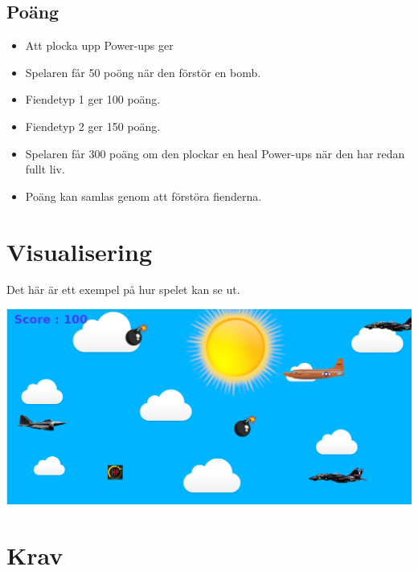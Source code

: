 \documentclass{TDP005mall}
\begin{document}
\subsection{Poäng}
\begin{itemize}
\item Att plocka upp Power-ups ger
\item Spelaren får 50 poöng när den förstör en bomb.
\item Fiendetyp 1 ger 100 poäng.
\item Fiendetyp 2 ger 150 poäng. 
\item Spelaren får 300 poäng om den plockar en heal Power-ups när den har redan fullt liv.  
\item Poäng kan samlas genom att förstöra fienderna.

\end{itemize}

\newpage
\section{Visualisering}
Det här är ett exempel på hur spelet kan se ut.


\includegraphics[scale=0.35]{Images/Game.png}

\section{Krav}
\end{document}
